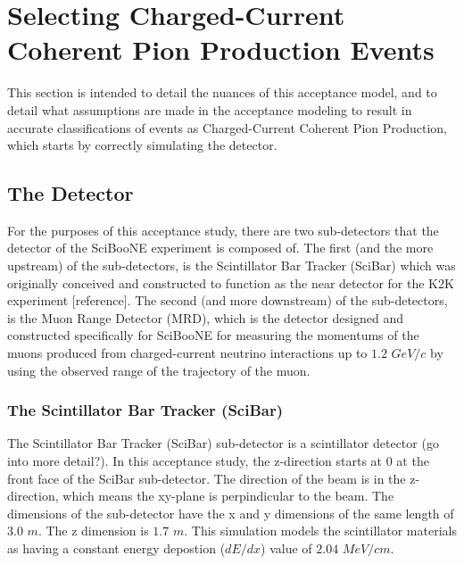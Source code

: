 \documentclass[11pt]{article}
\begin{document}
\section{Selecting Charged-Current Coherent Pion Production Events}
This section is intended to detail the nuances of this acceptance model, and to detail what assumptions are made in the acceptance modeling to result in accurate classifications of events as Charged-Current Coherent Pion Production, which starts by correctly simulating the detector.

\subsection{The Detector}
For the purposes of this acceptance study, there are two sub-detectors that the detector of the SciBooNE experiment is composed of. The first (and the more upstream) of the sub-detectors, is the Scintillator Bar Tracker (SciBar) which was originally conceived and constructed to function as the near detector for the K2K experiment [reference]. The second (and more downstream) of the sub-detectors, is the Muon Range Detector (MRD), which is the detector designed and constructed specifically for SciBooNE for measuring the momentums of the muons produced from charged-current neutrino interactions up to $1.2$ $GeV/c$ by using the observed range of the trajectory of the muon.

\subsubsection{The Scintillator Bar Tracker (SciBar)}
The Scintillator Bar Tracker (SciBar) sub-detector is a scintillator detector (go into more detail?). In this acceptance study, the z-direction starts at 0 at the front face of the SciBar sub-detector. The direction of the beam is in the z-direction, which means the xy-plane is perpindicular to the beam. The dimensions of the sub-detector have the x and y dimensions of the same length of $3.0$ $m$. The z dimension is $1.7$ $m$. This simulation models the scintillator materials as having a constant energy depostion ($dE/dx$) value of $2.04$ $MeV/cm$.
\end{document}
